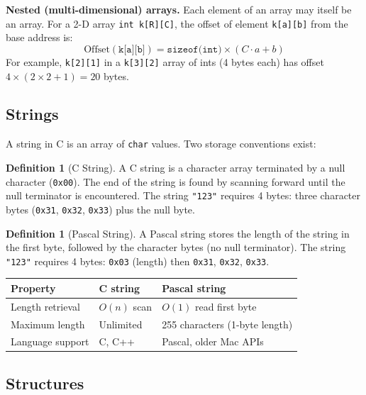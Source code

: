 \documentclass[11pt, a4paper, notitlepage]{report}
\theoremstyle{definition}
\newtheorem{definition}[theorem]{Definition}
\theoremstyle{remark}
\theoremstyle{definition}
\begin{document}
\textbf{Nested (multi-dimensional) arrays.} Each element of an array may itself be an array. For a 2-D array \texttt{int k[R][C]}, the offset of element \texttt{k[a][b]} from the base address is:
\[
  \text{Offset}(\texttt{k[a][b]}) = \texttt{sizeof(int)} \times (C \cdot a + b)
\]
For example, \texttt{k[2][1]} in a \texttt{k[3][2]} array of ints (4 bytes each) has offset $4 \times (2 \times 2 + 1) = 20$ bytes.

\subsection{Strings}

A string in C is an array of \texttt{char} values. Two storage conventions exist:

\begin{definition}[C String]
\label{def:cstring}
A C string is a character array terminated by a null character (\texttt{0x00}). The end of the string is found by scanning forward until the null terminator is encountered. The string \texttt{"123"} requires 4 bytes: three character bytes (\texttt{0x31}, \texttt{0x32}, \texttt{0x33}) plus the null byte.
\end{definition}

\begin{definition}[Pascal String]
\label{def:pascal-string}
A Pascal string stores the length of the string in the first byte, followed by the character bytes (no null terminator). The string \texttt{"123"} requires 4 bytes: \texttt{0x03} (length) then \texttt{0x31}, \texttt{0x32}, \texttt{0x33}.
\end{definition}

\begin{center}
\begin{tabular}{lll}
\toprule
\textbf{Property} & \textbf{C string} & \textbf{Pascal string} \\
\midrule
Length retrieval & $O(n)$ scan & $O(1)$ read first byte \\
Maximum length & Unlimited & 255 characters (1-byte length) \\
Language support & C, C++ & Pascal, older Mac APIs \\
\bottomrule
\end{tabular}
\end{center}

\subsection{Structures}
\end{document}
